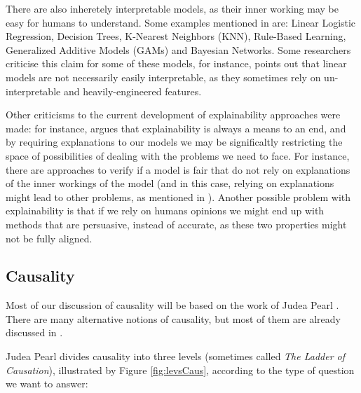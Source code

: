 There are also inheretely interpretable models, as their inner working may be easy for humans to understand. Some examples mentioned in \cite{belle2021principles} are: Linear Logistic Regression, Decision Trees, K-Nearest Neighbors (KNN), Rule-Based Learning, Generalized Additive Models (GAMs) and Bayesian Networks. Some researchers criticise this claim for some of these models, for instance, \cite{lipton2018mythos} points out that linear models are not necessarily easily interpretable, as they sometimes rely on un-interpretable and heavily-engineered features.

Other criticisms to the current development of explainability approaches were made: for instance, \cite{krishnan2020against} argues that explainability is always a means to an end, and by requiring explanations to our models we may be significaltly restricting the space of possibilities of dealing with the problems we need to face. For instance, there are approaches to verify if a model is fair that do not rely on explanations of the inner workings of the model (and in this case, relying on explanations might lead to other problems, as mentioned in \cite{ExplainAll}). Another possible problem with explainability is that if we rely on humans opinions we might end up with methods that are persuasive, instead of accurate, as these two properties might not be fully aligned. 

\subsection{Causality}

Most of our discussion of causality will be based on the work of Judea Pearl \cite{Causality}. There are many alternative notions of causality, but most of them are already discussed in \cite{Causality}. 

Judea Pearl divides causality into three levels (sometimes called \emph{The Ladder of Causation}), illustrated by Figure \ref{fig:levsCaus}, according to the type of question we want to answer:

